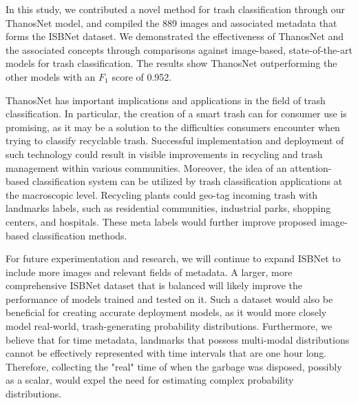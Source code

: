 \documentclass[conference]{ieeeconf}
\begin{document}
In this study, we contributed a novel method for trash classification through our ThanosNet model, and compiled the 889 images and associated metadata that forms the ISBNet dataset. We demonstrated the effectiveness of ThanosNet and the associated concepts through comparisons against image-based, state-of-the-art models for trash classification. The results show ThanosNet outperforming the other models with an $F_1$ score of 0.952.

ThanosNet has important implications and applications in the field of trash classification. In particular, the creation of a smart trash can for consumer use is promising, as it may be a solution to the difficulties consumers encounter when trying to classify recyclable trash. Successful implementation and deployment of such technology could result in visible improvements in recycling and trash management within various communities. Moreover, the idea of an attention-based classification system can be utilized by trash classification applications at the macroscopic level. Recycling plants could geo-tag incoming trash with landmarks labels, such as residential communities, industrial parks, shopping centers, and hospitals. These meta labels would further improve proposed image-based classification methods.

For future experimentation and research, we will continue to expand ISBNet to include more images and relevant fields of metadata. A larger, more comprehensive ISBNet dataset that is balanced will likely improve the performance of models trained and tested on it. Such a dataset would also be beneficial for creating accurate deployment models, as it would more closely model real-world, trash-generating probability distributions. Furthermore, we believe that for time metadata, landmarks that possess multi-modal distributions cannot be effectively represented with time intervals that are one hour long. Therefore, collecting the "real" time of when the garbage was disposed, possibly as a scalar, would expel the need for estimating complex probability distributions.

\addtolength{\textheight}{-12cm}   %
\end{document}
